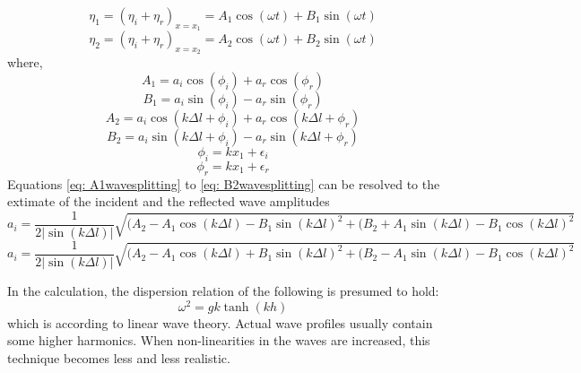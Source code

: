 \begin{equation}
    \eta_1 = (\eta_i + \eta_r)_{x=x_1} = A_1 \cos(\omega t) + B_1 \sin(\omega t)
\end{equation}
\begin{equation}
    \eta_2 = (\eta_i + \eta_r)_{x=x_2} = A_2 \cos(\omega t) + B_2 \sin(\omega t)
\end{equation}
where,
\begin{equation}
    A_1 = a_i \cos(\phi_i) + a_r \cos(\phi_r)
    \label{eq: A1wavesplitting}
\end{equation}
\begin{equation}
    B_1 = a_i \sin(\phi_i) - a_r \sin(\phi_r)
\end{equation}
\begin{equation}
    A_2 = a_i \cos(k \Delta l + \phi_i) + a_r \cos(k\Delta l + \phi_r)
\end{equation}
\begin{equation}
    B_2 = a_i \sin(k \Delta l + \phi_i) - a_r \sin(k\Delta l + \phi_r)
    \label{eq: B2wavesplitting}
\end{equation}
\begin{equation}
    \phi_i = k x_1 + \epsilon_i
\end{equation}
\begin{equation}
    \phi_r = k x_1 + \epsilon_r
\end{equation}
Equations \ref{eq: A1wavesplitting} to \ref{eq: B2wavesplitting} can be resolved to the extimate of the incident and the reflected wave amplitudes
\begin{equation}
    a_i = \frac{1}{2 |\sin(k\Delta l)|}\sqrt{(A_2 - A_1 \cos(k \Delta l) - B_1 \sin(k\Delta l)^2 + (B_2 + A_1 \sin(k \Delta l) - B_1 \cos(k\Delta l)^2}
\end{equation}
\begin{equation}
    a_i = \frac{1}{2 |\sin(k\Delta l)|}\sqrt{(A_2 - A_1 \cos(k \Delta l) + B_1 \sin(k\Delta l)^2 + (B_2 - A_1 \sin(k \Delta l) - B_1 \cos(k\Delta l)^2}
\end{equation}


In the calculation, the dispersion relation of the following is presumed to hold:
\begin{equation}
    \omega ^2 = gk \tanh(kh)
\end{equation}
which is according to linear wave theory. Actual wave profiles usually contain some higher harmonics. When non-linearities in the waves are increased, this technique becomes less and less realistic.